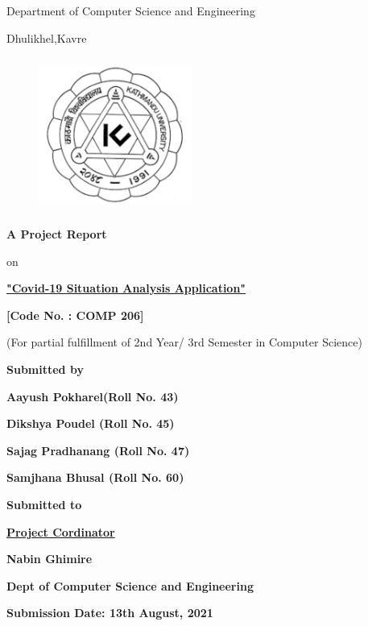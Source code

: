 \documentclass[12pt]{article}
\begin{document}
\thispagestyle{empty}

\section*{}
{\LARGE{}}

\centerline{Department of Computer Science and Engineering}
\centerline{Dhulikhel,Kavre}
\begin{figure}[h]
    \centerline{\includegraphics[width=50.546mm,height=50.546mm]{KU_Logo.png}}
\end{figure}

\centerline{\textbf{A Project Report}}
\centerline{on}
\centerline{\underline{\textbf{"Covid-19 Situation Analysis Application"}}}

\vspace*{12mm}

\centerline{\textbf{[Code No. : COMP 206]}}
\centerline{(For partial fulfillment of 2nd Year/ 3rd Semester in Computer Science)}

\vspace*{10mm}

\centerline{\textbf{Submitted by}}
\centerline{\textbf{Aayush Pokharel(Roll No. 43)}}
\centerline{\textbf{Dikshya Poudel (Roll No. 45)}}
\centerline{\textbf{Sajag Pradhanang (Roll No. 47)}}
\centerline{\textbf{Samjhana Bhusal (Roll No. 60)}}

\vspace*{16mm}


\centerline{\textbf{Submitted to}}
\centerline{\underline{\textbf{Project Cordinator}}}
\centerline{\textbf{Nabin Ghimire}}
\centerline{\textbf{Dept of Computer Science and Engineering}}
\vspace*{10mm}

\centerline{\textbf{Submission Date: 13th August, 2021}}
\end{document}
